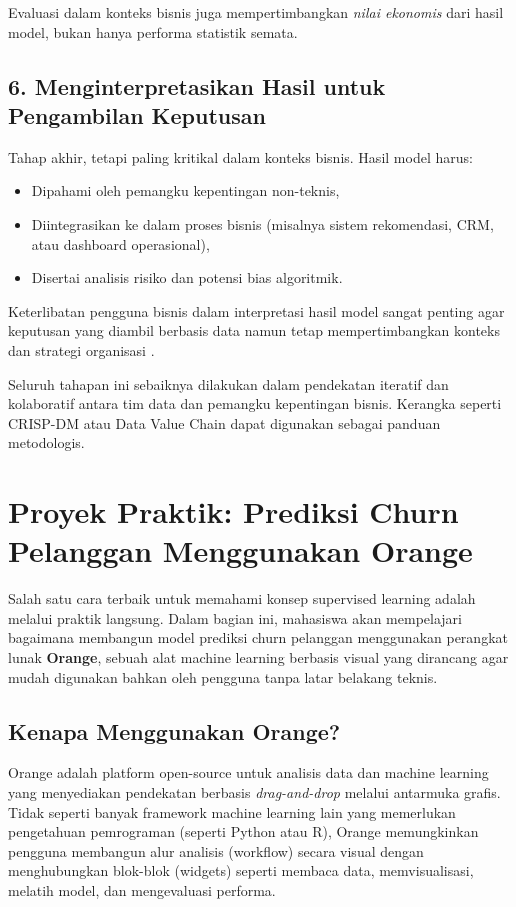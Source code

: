 Evaluasi dalam konteks bisnis juga mempertimbangkan \textit{nilai ekonomis} dari hasil model, bukan hanya performa statistik semata.

\subsection*{6. Menginterpretasikan Hasil untuk Pengambilan Keputusan}

Tahap akhir, tetapi paling kritikal dalam konteks bisnis. Hasil model harus:
\begin{itemize}
	\item Dipahami oleh pemangku kepentingan non-teknis,
	\item Diintegrasikan ke dalam proses bisnis (misalnya sistem rekomendasi, CRM, atau dashboard operasional),
	\item Disertai analisis risiko dan potensi bias algoritmik.
\end{itemize}

Keterlibatan pengguna bisnis dalam interpretasi hasil model sangat penting agar keputusan yang diambil berbasis data namun tetap mempertimbangkan konteks dan strategi organisasi \cite{provost2013data,davenport2018}.

\bigskip

\noindent
Seluruh tahapan ini sebaiknya dilakukan dalam pendekatan iteratif dan kolaboratif antara tim data dan pemangku kepentingan bisnis. Kerangka seperti CRISP-DM atau Data Value Chain dapat digunakan sebagai panduan metodologis.



\section{Proyek Praktik: Prediksi Churn Pelanggan Menggunakan Orange}

Salah satu cara terbaik untuk memahami konsep supervised learning adalah melalui praktik langsung. Dalam bagian ini, mahasiswa akan mempelajari bagaimana membangun model prediksi churn pelanggan menggunakan perangkat lunak \textbf{Orange}, sebuah alat machine learning berbasis visual yang dirancang agar mudah digunakan bahkan oleh pengguna tanpa latar belakang teknis.

\subsection{Kenapa Menggunakan Orange?}

Orange adalah platform open-source untuk analisis data dan machine learning yang menyediakan pendekatan berbasis \textit{drag-and-drop} melalui antarmuka grafis. Tidak seperti banyak framework machine learning lain yang memerlukan pengetahuan pemrograman (seperti Python atau R), Orange memungkinkan pengguna membangun alur analisis (workflow) secara visual dengan menghubungkan blok-blok (widgets) seperti membaca data, memvisualisasi, melatih model, dan mengevaluasi performa.

